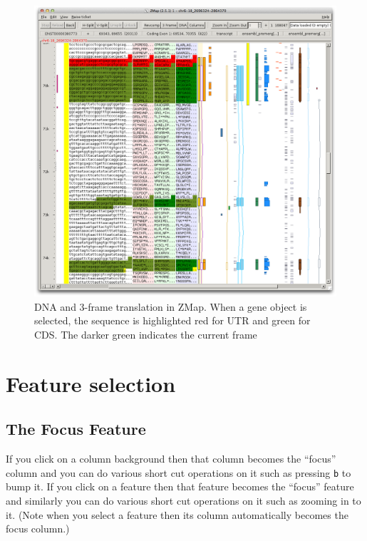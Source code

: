 \documentclass[letterpaper]{article}
\begin{document}
\begin{figure}
\centering
\color[rgb]{0.30980393,0.5058824,0.7411765}
\includegraphics[width=15.231cm]{images/dna_3_frame.png}
\caption{DNA and 3-frame translation in ZMap. When a gene object is selected, the sequence is highlighted red for UTR and green for CDS. The darker green indicates the current frame}
\label{img_dna_3_frame}
\end{figure}


\clearpage
\section{Feature selection}

\subsection{The Focus Feature}
If you click on a column background then that column becomes the ``focus'' column and you can do various short cut operations on it such as pressing \lstinline{b} to bump it. If you click on a feature then that feature becomes the ``focus'' feature and similarly you can do various short cut operations on it such as zooming in to it. (Note when you select a feature then its column automatically becomes the focus column.)
\end{document}
